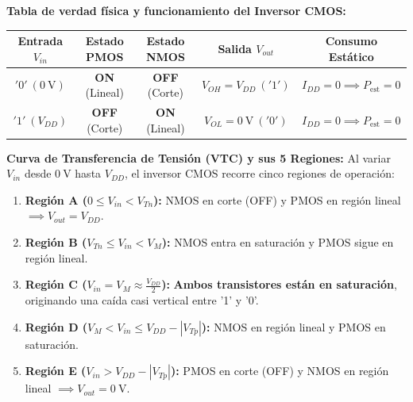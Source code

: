 \textbf{Tabla de verdad física y funcionamiento del Inversor CMOS:}
\begin{center}
\renewcommand{\arraystretch}{1.25}
\begin{tabular}{c c c c c}
\toprule
\textbf{Entrada $V_{in}$} & \textbf{Estado PMOS} & \textbf{Estado NMOS} & \textbf{Salida $V_{out}$} & \textbf{Consumo Estático} \\
\midrule
$'0'\ (0\ \si{\volt})$ & \textbf{ON} (Lineal) & \textbf{OFF} (Corte) & $V_{OH} = V_{DD}\ ('1')$ & $I_{DD} = 0 \implies P_{\text{est}} = 0$ \\
$'1'\ (V_{DD})$ & \textbf{OFF} (Corte) & \textbf{ON} (Lineal) & $V_{OL} = 0\ \si{\volt}\ ('0')$ & $I_{DD} = 0 \implies P_{\text{est}} = 0$ \\
\bottomrule
\end{tabular}
\end{center}

\textbf{Curva de Transferencia de Tensión (VTC) y sus 5 Regiones:}
Al variar $V_{in}$ desde $0\ \si{\volt}$ hasta $V_{DD}$, el inversor CMOS recorre cinco regiones de operación:
\begin{enumerate}[leftmargin=*]
    \item \textbf{Región A ($0 \le V_{in} < V_{Tn}$):} NMOS en corte (OFF) y PMOS en región lineal $\implies V_{out} = V_{DD}$.
    \item \textbf{Región B ($V_{Tn} \le V_{in} < V_M$):} NMOS entra en saturación y PMOS sigue en región lineal.
    \item \textbf{Región C ($V_{in} = V_M \approx \frac{V_{DD}}{2}$):} \textbf{Ambos transistores están en saturación}, originando una caída casi vertical entre '1' y '0'.
    \item \textbf{Región D ($V_M < V_{in} \le V_{DD} - |V_{Tp}|$):} NMOS en región lineal y PMOS en saturación.
    \item \textbf{Región E ($V_{in} > V_{DD} - |V_{Tp}|$):} PMOS en corte (OFF) y NMOS en región lineal $\implies V_{out} = 0\ \si{\volt}$.
\end{enumerate}

\begin{center}
\end{center}

